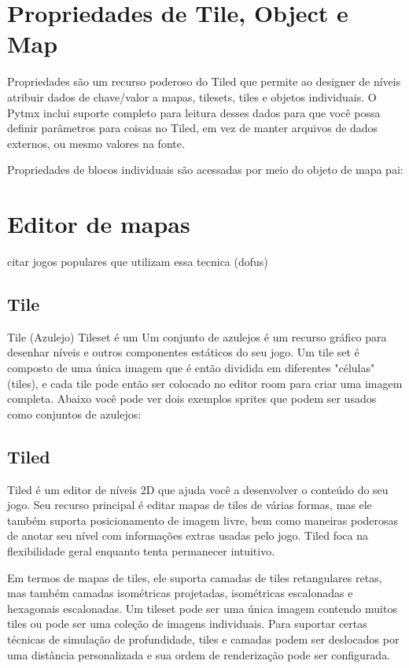 \section{\textbf{Propriedades de Tile, Object e Map}}

Propriedades são um recurso poderoso do Tiled que permite ao designer de níveis atribuir dados de chave/valor a mapas, tilesets, tiles e objetos individuais. O Pytmx inclui suporte completo para leitura desses dados para que você possa definir parâmetros para coisas no Tiled, em vez de manter arquivos de dados externos, ou mesmo valores na fonte.

Propriedades de blocos individuais são acessadas por meio do objeto de mapa pai:
 

\section{Editor de mapas}
citar jogos populares que utilizam essa tecnica (dofus)
\subsection{Tile}
Tile (Azulejo) 
Tileset é um Um conjunto de azulejos é um recurso gráfico para desenhar níveis e outros componentes estáticos do seu jogo. Um tile set é composto de uma única imagem que é então dividida em diferentes "células" (tiles), e cada tile pode então ser colocado no editor room para criar uma imagem completa. Abaixo você pode ver dois exemplos sprites que podem ser usados como conjuntos de azulejos:
\subsection{Tiled}

Tiled é um editor de níveis 2D que ajuda você a desenvolver o conteúdo do seu jogo. Seu recurso principal é editar mapas de tiles de várias formas, mas ele também suporta posicionamento de imagem livre, bem como maneiras poderosas de anotar seu nível com informações extras usadas pelo jogo. Tiled foca na flexibilidade geral enquanto tenta permanecer intuitivo.

Em termos de mapas de tiles, ele suporta camadas de tiles retangulares retas, mas também camadas isométricas projetadas, isométricas escalonadas e hexagonais escalonadas. Um tileset pode ser uma única imagem contendo muitos tiles ou pode ser uma coleção de imagens individuais. Para suportar certas técnicas de simulação de profundidade, tiles e camadas podem ser deslocados por uma distância personalizada e sua ordem de renderização pode ser configurada.

